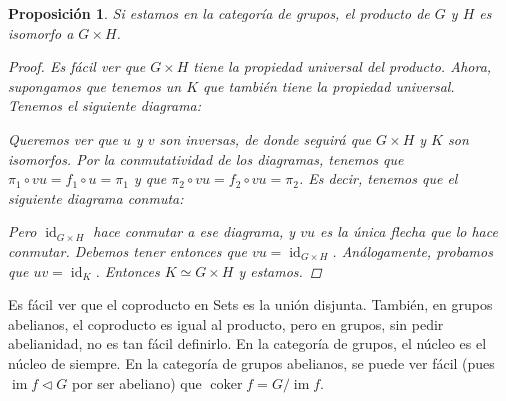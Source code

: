 \documentclass[12pt]{book}
\newtheorem{prop}[teo]{Proposición}
\theoremstyle{definition}
\DeclareMathOperator{\id}{id}
\DeclareMathOperator{\im}{im}
\DeclareMathOperator{\coker}{coker}
\begin{document}
\begin{prop}
Si estamos en la categoría de grupos, el producto de $G$ y $H$ es isomorfo a $G\times H$.
\begin{proof}
Es fácil ver que $G\times H$ tiene la propiedad universal del producto. Ahora, supongamos que tenemos un $K$ que también tiene la propiedad universal. Tenemos el siguiente diagrama:
\begin{center}
\end{center}
Queremos ver que $u$ y $v$ son inversas, de donde seguirá que $G\times H$ y $K$ son isomorfos. Por la conmutatividad de los diagramas, tenemos que $\pi_1\circ vu = f_1 \circ u = \pi_1$ y que $\pi_2 \circ vu = f_2\circ vu = \pi_2$. Es decir, tenemos que el siguiente diagrama conmuta:
\begin{center}
\end{center}
Pero $\id_{G\times H}$ hace conmutar a ese diagrama, y $vu$ es la única flecha que lo hace conmutar. Debemos tener entonces que $vu=\id_{G\times H}$. Análogamente, probamos que $uv = \id_{K}$. Entonces $K\simeq G\times H$ y estamos.
\end{proof}
\end{prop}

Es fácil ver que el coproducto en Sets es la unión disjunta. También, en grupos abelianos, el coproducto es igual al producto, pero en grupos, sin pedir abelianidad, no es tan fácil definirlo. En la categoría de grupos, el núcleo es el núcleo de siempre. En la categoría de grupos abelianos, se puede ver fácil (pues $\im f\triangleleft G$ por ser abeliano) que $\coker f = G/\im f$.
\end{document}
